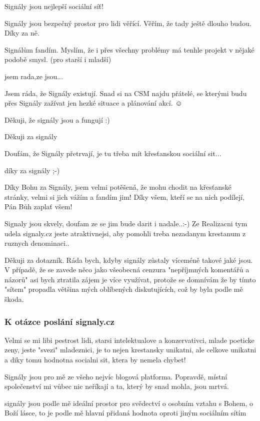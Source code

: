 Signály jsou nejlepší sociální síť!

Signály jsou bezpečný prostor pro lidi věřící. Věřím, že tady ještě dlouho budou. Díky za ně.

Signálům fandím. Myslím, že i přes všechny problémy má tenhle projekt v nějaké podobě smysl. (pro starší i mladší)

jsem rada,ze jsou...

Jsem ráda, že Signály existují. Snad si na CSM najdu přátelé, se kterými budu přes Signály zažívat jen hezké situace a plánování akcí. ☺

Děkuji, že signály jsou a fungují :)

Děkuji za signály

Doufám, že Signály přetrvají, je tu třeba mít křesťanskou sociální sit...

díky za signály ;-)

Díky Bohu za Signály, jsem velmi potěšená, že mohu chodit na křesťanské stránky, velmi si jich vážím a fandím jim! Díky všem, kteří se na nich podílejí, Pán Bůh zaplať všem!

Signaly jsou skvely, doufam ze se jim bude darit i nadale..:-) Ze Realizacni tym udela signaly.cz jeste atraktivnejsi, aby pomohli treba nezadanym krestanum z ruznych denominaci..

Děkuji za dotazník. Ráda bych, kdyby signály zůstaly víceméně takové jaké jsou. V případě, že se zavede něco jako všeobecná cenzura "nepříjmných komentářů a názorů" asi bych ztratila zájem je více využívat, protože se domnívám že by tímto "sítem" propadla většina mých oblíbených diskutujících, což by byla podle mě škoda.

\subsubsection{K otázce poslání signaly.cz}

Velmi se mi libi pestrost lidi, starsi intelektualove a konzervativci, mlade poeticke zeny, jeste "svezi" mladeznici, je to nejen krestansky unikatni, ale celkove unikatni a diky tomu hodnotna socialni sit, ktera by nemela chybet!

Signály jsou pro mě ze všeho nejvíc blogová platforma. Popravdě, místní společenství mi vůbec nic neříkají a ta, který by snad mohla, jsou mrtvá.

signály jsou podle mě ideální prostor pro svědectví o osobním vztahu s Bohem, o Boží lásce, to je podle mě hlavní přidaná hodnota oproti jiným sociálním sítím

